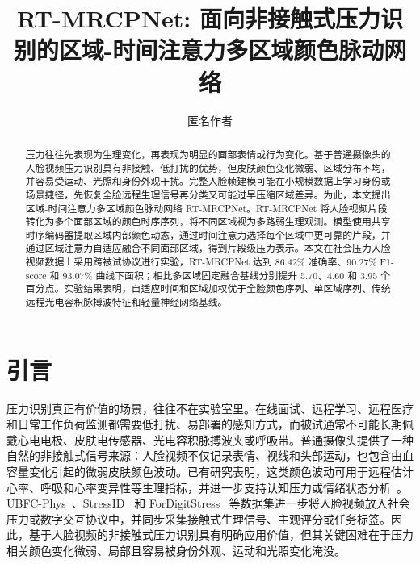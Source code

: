 \documentclass[runningheads]{llncs}
\begin{document}
\title{RT-MRCPNet: 面向非接触式压力识别的区域-时间注意力多区域颜色脉动网络}

\author{匿名作者}

\maketitle

\begin{abstract}
压力往往先表现为生理变化，再表现为明显的面部表情或行为变化。基于普通摄像头的人脸视频压力识别具有非接触、低打扰的优势，但皮肤颜色变化微弱、区域分布不均，并容易受运动、光照和身份外观干扰。完整人脸帧建模可能在小规模数据上学习身份或场景捷径，先恢复全脸远程生理信号再分类又可能过早压缩区域差异。为此，本文提出区域-时间注意力多区域颜色脉动网络 RT-MRCPNet。RT-MRCPNet 将人脸视频片段转化为多个面部区域的颜色时序序列，将不同区域视为多路弱生理观测。模型使用共享时序编码器提取区域内部颜色动态，通过时间注意力选择每个区域中更可靠的片段，并通过区域注意力自适应融合不同面部区域，得到片段级压力表示。本文在社会压力人脸视频数据上采用跨被试协议进行实验，RT-MRCPNet 达到 86.42\% 准确率、90.27\% F1-score 和 93.07\% 曲线下面积；相比多区域固定融合基线分别提升 5.70、4.60 和 3.95 个百分点。实验结果表明，自适应时间和区域加权优于全脸颜色序列、单区域序列、传统远程光电容积脉搏波特征和轻量神经网络基线。

\end{abstract}

\section{引言}

压力识别真正有价值的场景，往往不在实验室里。在线面试、远程学习、远程医疗和日常工作负荷监测都需要低打扰、易部署的感知方式，而被试通常不可能长期佩戴心电电极、皮肤电传感器、光电容积脉搏波夹或呼吸带。普通摄像头提供了一种自然的非接触式信号来源：人脸视频不仅记录表情、视线和头部运动，也包含由血容量变化引起的微弱皮肤颜色波动。已有研究表明，这类颜色波动可用于远程估计心率、呼吸和心率变异性等生理指标，并进一步支持认知压力或情绪状态分析~\cite{mcduff2014remote,benezeth2018remotehrv,nikolaiev2020noncontact}。UBFC-Phys~\cite{sabour2021ubfcphys}、StressID~\cite{chaptoukaev2023stressid} 和 ForDigitStress~\cite{heimerl2024fordigitstress} 等数据集进一步将人脸视频放入社会压力或数字交互协议中，并同步采集接触式生理信号、主观评分或任务标签。因此，基于人脸视频的非接触式压力识别具有明确应用价值，但其关键困难在于压力相关颜色变化微弱、局部且容易被身份外观、运动和光照变化淹没。
\end{document}

